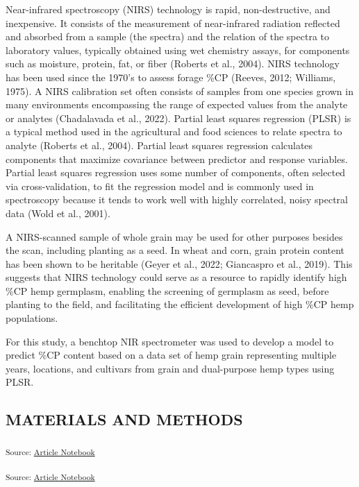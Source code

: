\documentclass[
]{agujournal2019}
\begin{document}
Near-infrared spectroscopy (NIRS) technology is rapid, non-destructive,
and inexpensive. It consists of the measurement of near-infrared
radiation reflected and absorbed from a sample (the spectra) and the
relation of the spectra to laboratory values, typically obtained using
wet chemistry assays, for components such as moisture, protein, fat, or
fiber (Roberts et al., 2004). NIRS technology has been used since the
1970's to assess forage \%CP (Reeves, 2012; Williams, 1975). A NIRS
calibration set often consists of samples from one species grown in many
environments encompassing the range of expected values from the analyte
or analytes (Chadalavada et al., 2022). Partial least squares regression
(PLSR) is a typical method used in the agricultural and food sciences to
relate spectra to analyte (Roberts et al., 2004). Partial least squares
regression calculates components that maximize covariance between
predictor and response variables. Partial least squares regression uses
some number of components, often selected via cross-validation, to fit
the regression model and is commonly used in spectroscopy because it
tends to work well with highly correlated, noisy spectral data (Wold et
al., 2001).

A NIRS-scanned sample of whole grain may be used for other purposes
besides the scan, including planting as a seed. In wheat and corn, grain
protein content has been shown to be heritable (Geyer et al., 2022;
Giancaspro et al., 2019). This suggests that NIRS technology could serve
as a resource to rapidly identify high \%CP hemp germplasm, enabling the
screening of germplasm as seed, before planting to the field, and
facilitating the efficient development of high \%CP hemp populations.

For this study, a benchtop NIR spectrometer was used to develop a model
to predict \%CP content based on a data set of hemp grain representing
multiple years, locations, and cultivars from grain and dual-purpose
hemp types using PLSR.

\subsection{MATERIALS AND METHODS}\label{materials-and-methods}

\textsubscript{Source:
\href{https://rvcrawford.github.io/glowing-system/index.qmd.html}{Article
Notebook}}

\textsubscript{Source:
\href{https://rvcrawford.github.io/glowing-system/index.qmd.html}{Article
Notebook}}
\end{document}
